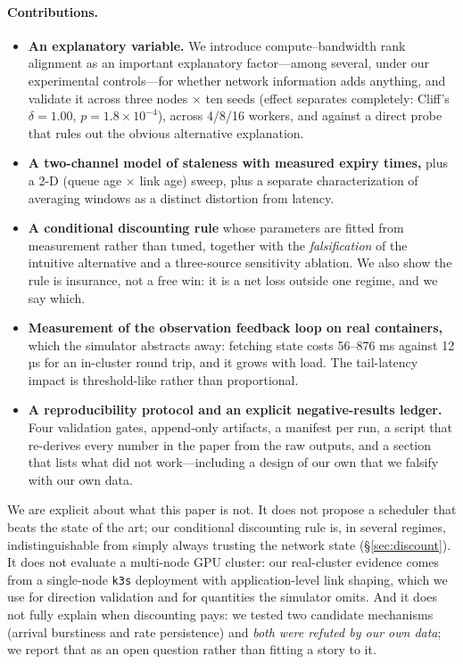 \paragraph{Contributions.}
\begin{itemize}
  \item \textbf{An explanatory variable.} We introduce compute--bandwidth rank alignment as an
        important explanatory factor---among several, under our experimental controls---for
        whether network information adds anything, and validate it across three
        nodes $\times$ ten seeds (effect separates completely: Cliff's $\delta=1.00$,
        $p=1.8\times10^{-4}$), across 4/8/16 workers, and against a direct probe that rules out
        the obvious alternative explanation.
  \item \textbf{A two-channel model of staleness with measured expiry times,} plus a 2-D
        (queue age $\times$ link age) sweep, plus a separate characterization of averaging
        windows as a distinct distortion from latency.
  \item \textbf{A conditional discounting rule} whose parameters are fitted from measurement
        rather than tuned, together with the \emph{falsification} of the intuitive alternative
        and a three-source sensitivity ablation. We also show the rule is insurance, not a
        free win: it is a net loss outside one regime, and we say which.
  \item \textbf{Measurement of the observation feedback loop on real containers,} which the
        simulator abstracts away: fetching state costs 56--876 ms against
        12 µs for an in-cluster round trip, and it grows with load. The
        tail-latency impact is threshold-like rather than proportional.
  \item \textbf{A reproducibility protocol and an explicit negative-results ledger.} Four
        validation gates, append-only artifacts, a manifest per run, a script that re-derives
        every number in the paper from the raw outputs, and a section that lists what did not
        work---including a design of our own that we falsify with our own data.
\end{itemize}

We are explicit about what this paper is not. It does not propose a scheduler that beats the
state of the art; our conditional discounting rule is, in several regimes, indistinguishable
from simply always trusting the network state (\S\ref{sec:discount}). It does not evaluate a
multi-node GPU cluster: our real-cluster evidence comes from a single-node \texttt{k3s}
deployment with application-level link shaping, which we use for direction validation and for
quantities the simulator omits. And it does not fully explain when discounting pays: we tested
two candidate mechanisms (arrival burstiness and rate persistence) and \emph{both were refuted
by our own data}; we report that as an open question rather than fitting a story to it.
